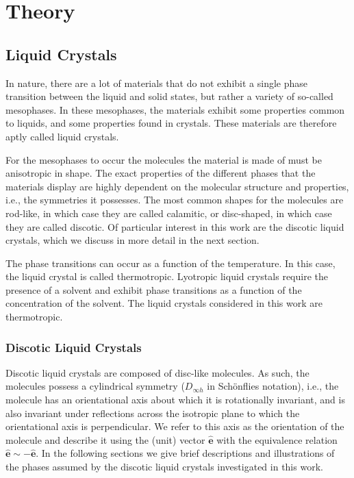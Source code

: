 
\chapter{Theory}
\label{chap:Theory}
\vspace{2cm}
\section{Liquid Crystals}
\label{sec:liquidcrystals}
In nature, there are a lot of materials that do not exhibit a single phase transition between the liquid and solid states, but rather a variety of so-called mesophases. In these mesophases, the materials exhibit some properties common to liquids, and some properties found in crystals. These materials are therefore aptly called liquid crystals.

For the mesophases to occur the molecules the material is made of must be anisotropic in shape. The exact properties of the different phases that the materials display are highly dependent on the molecular structure and properties, i.e., the symmetries it possesses. The most common shapes for the molecules are rod-like, in which case they are called calamitic, or disc-shaped, in which case they are called discotic. Of particular interest in this work are the discotic liquid crystals, which we discuss in more detail in the next section.

The phase transitions can occur as a function of the temperature. In this case, the liquid crystal is called thermotropic. Lyotropic liquid crystals require the presence of a solvent and exhibit phase transitions as a function of the concentration of the solvent. The liquid crystals considered in this work are thermotropic.

\subsection{Discotic Liquid Crystals}
Discotic liquid crystals are composed of disc-like molecules. As such, the molecules possess a cylindrical symmetry ($D_{\infty h}$ in Schönflies notation), i.e., the molecule has an orientational axis about which it is rotationally invariant, and is also invariant under reflections across the isotropic plane to which the orientational axis is perpendicular. We refer to this axis as the orientation of the molecule and describe it using the (unit) vector $\hat{\mathbf{e}}$ with the equivalence relation $\hat{\mathbf{e}}\sim-\hat{\mathbf{e}}$. 
In the following sections we give brief descriptions and illustrations of the phases assumed by the discotic liquid crystals investigated in this work.
